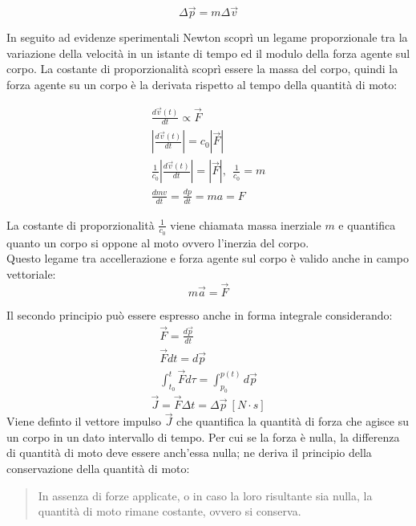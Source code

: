 \documentclass{article}
\numberwithin{equation}{subsection}
\begin{document}
\begin{equation}
    \Delta\vec{p}=m\Delta\vec{v}
\end{equation}

In seguito ad evidenze sperimentali Newton scoprì un legame 
proporzionale tra la variazione della velocità in un istante di tempo 
ed il modulo della forza agente sul corpo. La costante di proporzionalità 
scoprì essere la massa del corpo, quindi la forza agente 
su un corpo è la derivata rispetto al tempo della quantità di 
moto:

\begin{gather*}
    \displaystyle\frac{d\vec{v}(t)}{dt}\propto\vec{F}\\
    \left|\displaystyle\frac{d\vec{v}(t)}{dt}\right|=c_0\left|\vec{F}\right|\\
    \frac{1}{c_0} \left|\displaystyle\frac{d\vec{v}(t)}{dt}\right|=\left|\vec{F}\right|{,}\:\:\frac{1}{c_0}=m\\
    \displaystyle\frac{dmv}{dt}=\frac{dp}{dt}=ma=F
\end{gather*}

La costante di proporzionalità $\displaystyle\frac{1}{c_0}$ viene chiamata massa 
inerziale $m$ e quantifica quanto un corpo si oppone al moto ovvero l'inerzia 
del corpo.
\\
Questo legame tra accellerazione e forza agente sul corpo è valido 
anche in campo vettoriale: 
\begin{equation}
    m\vec{a}=\vec{F}
\end{equation}

Il secondo principio può essere espresso anche in forma integrale 
considerando: 
\begin{gather*}
    \vec{F}=\displaystyle\frac{d\vec{p}}{dt}\\
    \vec{F}dt=d\vec{p}\\
    \displaystyle\int_{t_0}^{t}\vec{F}d\tau=\int_{p_0}^{p(t)}d\vec{p}
\end{gather*}
\begin{equation}
    \vec{J}=\vec{F}\Delta t=\Delta\vec{p}\:[N\cdot s]
\end{equation}
Viene definto il vettore impulso $\vec{J}$ che quantifica la quantità 
di forza che agisce su un corpo in un dato intervallo di tempo. 
Per cui se la forza è nulla, la differenza di quantità di moto deve essere anch'essa nulla; ne deriva il 
principio della conservazione della quantità di moto:
\begin{quotation}
    In assenza di forze applicate, o in caso la loro risultante sia nulla, la quantità di moto rimane costante, ovvero si conserva. 
\end{quotation}
\end{document}
